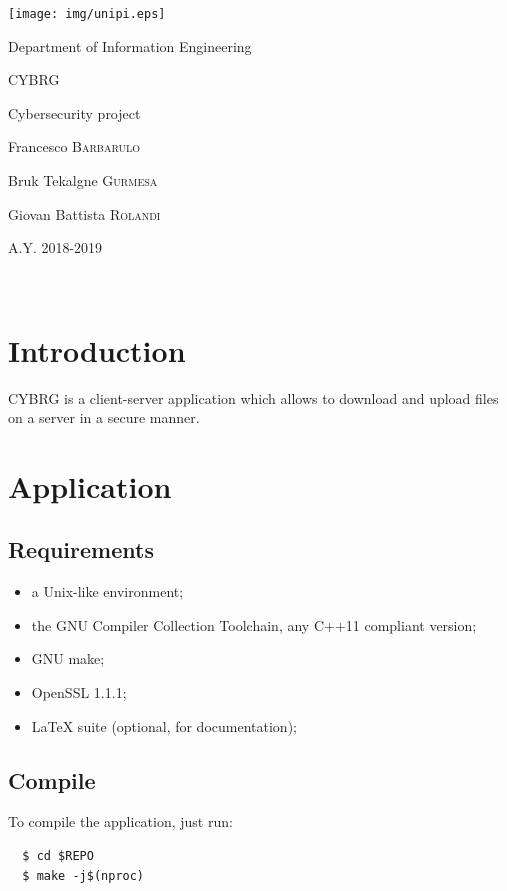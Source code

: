 \documentclass[a4paper,12pt]{article}
\newcommand{\projectname}{CYBRG}
\begin{document}

{
  \begin{titlepage}
  	\centering
  	\texttt{[image: img/unipi.eps]}\par
    \vspace{1.5cm}
    {\Large Department of Information Engineering \par}
  	\vspace{1.5cm}
  	{\huge\textsc{\projectname{}}\par}
    \vspace{0.5cm}
    {\Large Cybersecurity project \par}
  	\vspace{2cm}
  	Francesco \textsc{Barbarulo}\par
  	Bruk Tekalgne \textsc{Gurmesa}\par
    Giovan Battista \textsc{Rolandi}

  	\vfill

  	{\large A.Y. 2018-2019\par}
  \end{titlepage}
}


\clearpage
~
\clearpage
\tableofcontents
\clearpage
~
\clearpage
{}

\section{Introduction}
\projectname{} is a client-server application which allows to download and upload files on a server in a secure manner.

\section{Application}
\subsection{Requirements}
\begin{itemize}
  \item a Unix-like environment;
  \item the GNU Compiler Collection Toolchain, any C++11 compliant version;
  \item GNU make;
  \item OpenSSL 1.1.1;
  \item LaTeX suite (optional, for documentation);
\end{itemize}

\subsection{Compile}
To compile the application, just run:
\begin{verbatim}
  $ cd $REPO
  $ make -j$(nproc)
\end{verbatim}
\end{document}
